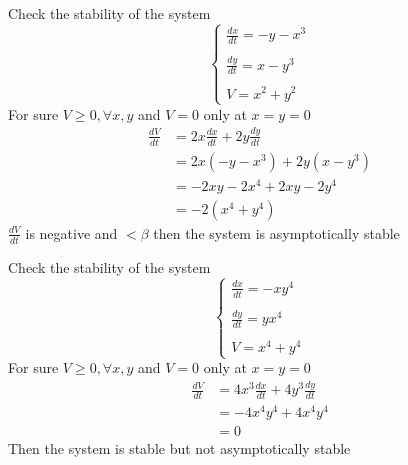 \documentclass[]{article}
\begin{document}
\begin{example}
    Check the stability of the system
    \begin{equation*}
        \begin{cases}
            \displaystyle \frac{dx}{dt} = -y -x^3
            \\\\
            \displaystyle \frac{dy}{dt} = x -y^3
            \\\\
            \displaystyle V = x^2 + y^2
        \end{cases}
    \end{equation*}
    For sure $V \geq 0 , \forall x,y$ and $V = 0$ only at $x=y=0 $
    \begin{align*}
        \frac{dV}{dt} & = 2x \frac{dx}{dt} + 2y \frac{dy}{dt}
        \\
                      & = 2x (-y -x^3) + 2y(x -y^3)
        \\
                      & = -2xy -2x^4 +2xy -2y^4
        \\
                      & = -2 (x^4 + y^4)
    \end{align*}
    $\displaystyle \frac{dV}{dt}$ is negative and $< \beta $ then the system is asymptotically stable
\end{example}
\begin{example}
    Check the stability of the system
    \begin{equation*}
        \begin{cases}
            \displaystyle \frac{dx}{dt} = -xy^4
            \\\\
            \displaystyle \frac{dy}{dt} = yx^4
            \\\\
            \displaystyle V = x^4 + y^4
        \end{cases}
    \end{equation*}
    For sure $V \geq 0 , \forall x,y$ and $V = 0$ only at $x=y=0 $
    \begin{align*}
        \frac{dV}{dt} & = 4x^3 \frac{dx}{dt} + 4y^3 \frac{dy}{dt}
        \\
                      & = -4x^4y^4 + 4x^4y^4
        \\
                      & = 0
    \end{align*}
    Then the system is stable but not asymptotically stable
\end{example}
\end{document}
